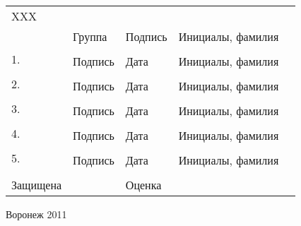 \begin{tabular}{p{10em}p{6em}@{}p{6em}@{}r@{}r}

XXX & \hrulefill{}  & \hrulefill{}  & \hrulefill{}  \\
 &  \scriptsize{Группа}  & \scriptsize{Подпись} & \scriptsize{Инициалы, фамилия} \\


\multirow{2}{12em}{1. \newline{}} & \hrulefill{} & \hrulefill{} & \hrulefill{}  \\
 & \scriptsize{Подпись}  & \scriptsize{Дата} & \scriptsize{Инициалы, фамилия} \\

\multirow{2}{12em}{2. \newline{}} & \hrulefill{} & \hrulefill{} & \hrulefill{}  \\
 & \scriptsize{Подпись}  & \scriptsize{Дата} & \scriptsize{Инициалы, фамилия} \\

\multirow{2}{12em}{3. \newline{}} & \hrulefill{} & \hrulefill{} & \hrulefill{}  \\
 & \scriptsize{Подпись}  & \scriptsize{Дата} & \scriptsize{Инициалы, фамилия} \\

\multirow{2}{12em}{4. \newline{}} & \hrulefill{} & \hrulefill{} & \hrulefill{}  \\
 & \scriptsize{Подпись}  & \scriptsize{Дата} & \scriptsize{Инициалы, фамилия} \\

\multirow{2}{12em}{5. \newline{}} & \hrulefill{} & \hrulefill{} & \hrulefill{}  \\
 & \scriptsize{Подпись}  & \scriptsize{Дата} & \scriptsize{Инициалы, фамилия} \\


& & & \\
Защищена \hrulefill{} &  & Оценка \hrulefill{} & \hrulefill{} 
\end{tabular}

\vspace{10mm}

\begin{center}Воронеж 2011\end{center}
